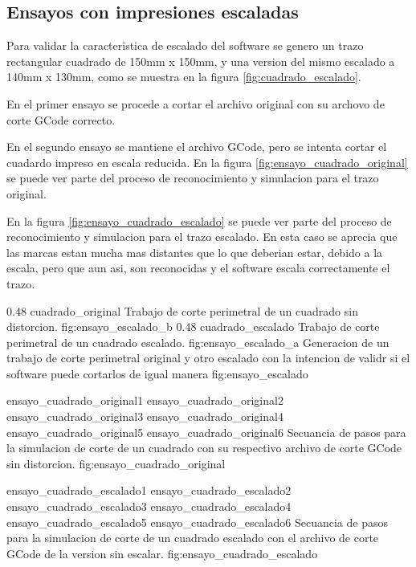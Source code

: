 \subsection{Ensayos con impresiones escaladas}

Para validar la caracteristica de escalado del software se genero un trazo rectangular cuadrado de 150mm x 150mm, y una version del mismo escalado a 140mm x 130mm, como se muestra en la figura \ref{fig:cuadrado_escalado}.\par
   En el primer ensayo se procede a cortar el archivo original con su archovo de corte GCode correcto. \par
   En el segundo ensayo se mantiene el archivo GCode, pero se intenta cortar el cuadardo impreso en escala reducida.
   En la figura \ref{fig:ensayo_cuadrado_original} se puede ver parte del proceso de reconocimiento y simulacion para el trazo original.\par
   En la figura \ref{fig:ensayo_cuadrado_escalado} se puede ver parte del proceso de reconocimiento y simulacion para el trazo escalado. En esta caso se aprecia que las marcas estan mucha mas distantes que lo que deberian estar, debido a la escala, pero que aun asi, son reconocidas y el software escala correctamente el trazo.

   
   \subfigab
   {0.48} {cuadrado_original} {Trabajo de corte perimetral de un cuadrado sin distorcion.} {fig:ensayo_escalado_b}
   {0.48} {cuadrado_escalado} {Trabajo de corte perimetral de un cuadrado escalado.} {fig:ensayo_escalado_a}
   {Generacion de un trabajo de corte perimetral original y otro escalado con la intencion de validr si el software puede cortarlos de igual manera }
   {fig:ensayo_escalado}

   \subfigthreethree
      {ensayo_cuadrado_original1}
      {ensayo_cuadrado_original2}
      {ensayo_cuadrado_original3}
      {ensayo_cuadrado_original4}
      {ensayo_cuadrado_original5}
      {ensayo_cuadrado_original6}
      {Secuancia de pasos para la simulacion de corte de un cuadrado con su respectivo archivo de corte GCode sin distorcion.}
      {fig:ensayo_cuadrado_original}


   \subfigthreethree
      {ensayo_cuadrado_escalado1}
      {ensayo_cuadrado_escalado2}
      {ensayo_cuadrado_escalado3}
      {ensayo_cuadrado_escalado4}
      {ensayo_cuadrado_escalado5}
      {ensayo_cuadrado_escalado6}
      {Secuancia de pasos para la simulacion de corte de un cuadrado escalado con el archivo de corte GCode de la version sin escalar.}
      {fig:ensayo_cuadrado_escalado}


